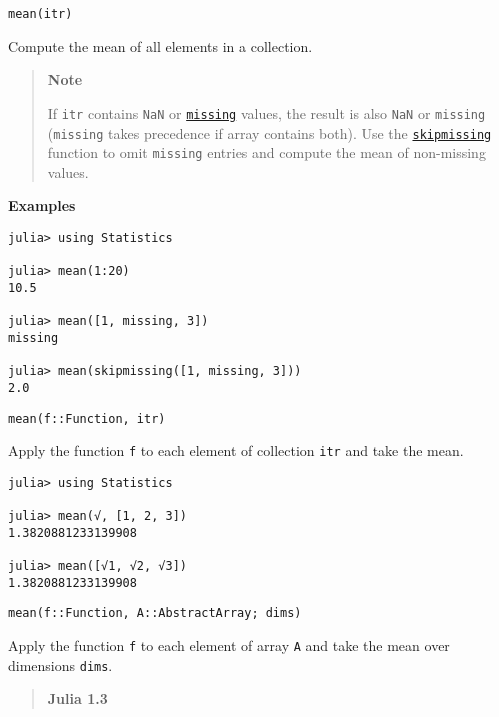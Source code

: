 \begin{adjustwidth}{2em}{0pt}


\begin{verbatim}
mean(itr)
\end{verbatim}

Compute the mean of all elements in a collection.

\begin{quote}
\textbf{Note}

If \texttt{itr} contains \texttt{NaN} or \hyperlink{14596725676261444434}{\texttt{missing}} values, the result is also \texttt{NaN} or \texttt{missing} (\texttt{missing} takes precedence if array contains both). Use the \hyperlink{2012470681884771400}{\texttt{skipmissing}} function to omit \texttt{missing} entries and compute the mean of non-missing values.

\end{quote}
\textbf{Examples}


\begin{verbatim}
julia> using Statistics

julia> mean(1:20)
10.5

julia> mean([1, missing, 3])
missing

julia> mean(skipmissing([1, missing, 3]))
2.0
\end{verbatim}




\begin{lstlisting}
mean(f::Function, itr)
\end{lstlisting}

Apply the function \texttt{f} to each element of collection \texttt{itr} and take the mean.


\begin{verbatim}
julia> using Statistics

julia> mean(√, [1, 2, 3])
1.3820881233139908

julia> mean([√1, √2, √3])
1.3820881233139908
\end{verbatim}




\begin{lstlisting}
mean(f::Function, A::AbstractArray; dims)
\end{lstlisting}

Apply the function \texttt{f} to each element of array \texttt{A} and take the mean over dimensions \texttt{dims}.

\begin{quote}
\textbf{Julia 1.3}


\end{quote}
\end{adjustwidth}
